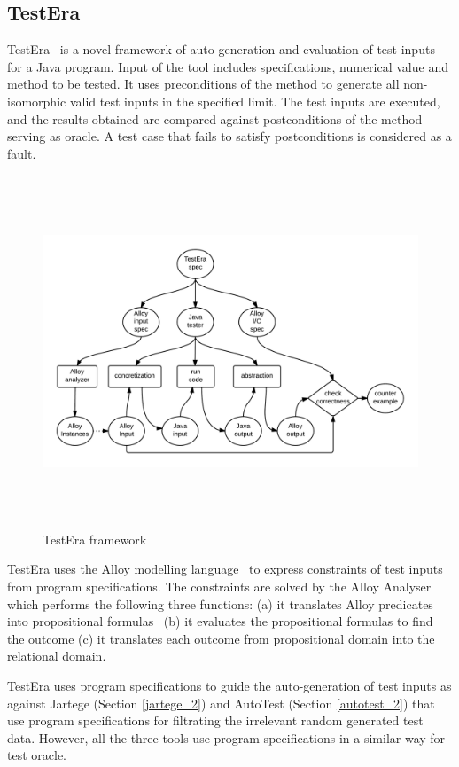 \subsection{TestEra}
TestEra~\cite{marinov2001testera} is a novel framework of auto-generation and evaluation of test inputs for a Java program. Input of the tool includes specifications, numerical value and method to be tested. It uses preconditions of the method to generate all non-isomorphic valid test inputs in the specified limit. The test inputs are executed, and the results obtained are compared against postconditions of the method serving as oracle. A test case that fails to satisfy postconditions is considered as a fault. 
\begin{figure}[h]
	\centering
	\centerline{\includegraphics[width=15.5cm, height=10.5cm]{chapter2/TestEra.png}}
	\bigskip
	\caption{TestEra framework~\cite{marinov2001testera}}
	\label{fig:testera}
\end{figure}
\bigskip
TestEra uses the Alloy modelling language~\cite{jackson2001micromodularity} to express constraints of test inputs from program specifications. The constraints are solved by the Alloy Analyser~\cite{jackson2000alcoa} which performs the following three functions: (a) it translates Alloy predicates into propositional formulas~%
(b) it evaluates the propositional formulas to find the outcome (c) it translates each outcome from propositional domain into the relational domain.




TestEra uses program specifications to guide the auto-generation of test inputs as against Jartege (Section \ref{jartege_2}) and AutoTest (Section \ref{autotest_2}) that use program specifications for filtrating the irrelevant random generated test data. However, all the three tools use program specifications in a similar way for test oracle. 


